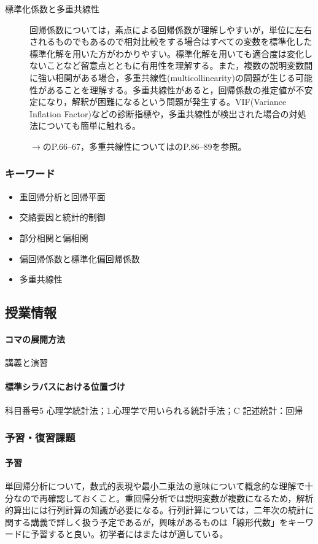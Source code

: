 \begin{description}
	\item[標準化係数と多重共線性] 回帰係数については，素点による回帰係数が理解しやすいが，単位に左右されるものでもあるので相対比較をする場合はすべての変数を標準化した標準化解を用いた方がわかりやすい。標準化解を用いても適合度は変化しないことなど留意点とともに有用性を理解する。また，複数の説明変数間に強い相関がある場合，多重共線性(multicollinearity)の問題が生じる可能性があることを理解する。多重共線性があると，回帰係数の推定値が不安定になり，解釈が困難になるという問題が発生する。VIF(Variance Inflation Factor)などの診断指標や，多重共線性が検出された場合の対処法についても簡単に触れる。
	      \begin{flushright}
		      $\to$\textcite{kosugi2018}のP.66--67，多重共線性については\textcite{Shimizu201705}のP.86--89を参照。
	      \end{flushright}

\end{description}
\subsubsection{キーワード}
\begin{itemize}
	\item 重回帰分析と回帰平面
	\item 交絡要因と統計的制御
	\item 部分相関と偏相関
	\item 偏回帰係数と標準化偏回帰係数
	\item 多重共線性
\end{itemize}
\subsection{授業情報}
\paragraph{コマの展開方法}
講義と演習
\paragraph{標準シラバスにおける位置づけ}
科目番号5 心理学統計法；1.心理学で用いられる統計手法；C 記述統計：回帰
\subsubsection{予習・復習課題}
\paragraph{予習}
単回帰分析について，数式的表現や最小二乗法の意味について概念的な理解で十分なので再確認しておくこと。重回帰分析では説明変数が複数になるため，解析的算出には行列計算の知識が必要になる。行列計算については，二年次の統計に関する講義で詳しく扱う予定であるが，興味があるものは「線形代数」をキーワードに予習すると良い。初学者には\textcite{Yuki201810}または\textcite{Okada200804}が適している。
